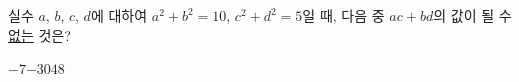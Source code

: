 실수 $a$, $b$, $c$, $d$에 대하여 $a^2+b^2=10$, $c^2+d^2=5$일 때, 다음 중 $ac+bd$의 값이 될 수 \underline{없는} 것은?
\begin{choices32}{$-7$}{$-3$}{$0$}{$4$}{$8$}\end{choices32}
